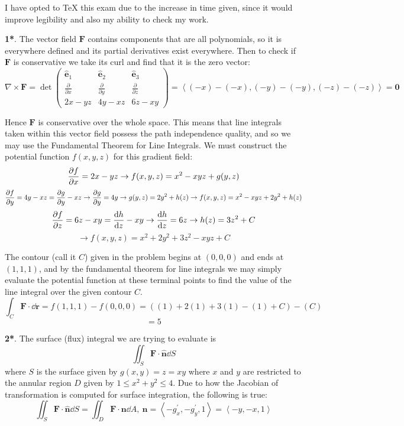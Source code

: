 \documentclass[11pt]{article}
\newcommand{\br}[1]{\left(#1\right)}
\begin{document}
\thispagestyle{firststyle}
I have opted to TeX this exam due to the increase in time given, since it would improve legibility and also my ability to check my work.

\textbf{1*}. The vector field $\mathbf{F}$ contains components that are all polynomials, so it is everywhere defined and its partial derivatives exist everywhere. Then to check if $\mathbf{F}$ is conservative we take its curl and find that it is the zero vector:
$$\nabla \times \mathbf{F} = \det \begin{pmatrix}
    \hat{\mathbf{e}}_1 & \hat{\mathbf{e}}_2 & \hat{\mathbf{e}}_3 \\
    \frac{\partial}{\partial x} & \frac{\partial}{\partial y} & \frac{\partial}{\partial z} \\
    2x-yz & 4y-xz & 6z-xy
\end{pmatrix} = \left\langle (-x)-(-x), (-y)-(-y) ,(-z)-(-z) \right \rangle = \mathbf{0}$$

Hence $\mathbf{F}$ is conservative over the whole space. This means that line integrals taken within this vector field possess the path independence quality, and so we may use the Fundamental Theorem for Line Integrals. We must construct the potential function $f(x,y,z)$ for this gradient field:
$$\pdv{f}{x} = 2x-yz \to f(x,y,z) = x^2-xyz + g(y,z)$$
$$\pdv{f}{y} = 4y-xz = \pdv{g}{y}-xz \to \pdv{g}{y} = 4y \to g(y,z) = 2y^2 + h(z) \to f(x,y,z) = x^2-xyz + 2y^2 + h(z)$$
$$\pdv{f}{z} = 6z-xy = \dv{h}{z} - xy \to \dv{h}{z} = 6z \to h(z) = 3z^2 + C$$
$$\to f(x,y,z) = x^2 + 2y^2 + 3z^2 -xyz + C$$

The contour (call it $C$) given in the problem begins at $(0,0,0)$ and ends at $(1,1,1)$, and by the fundamental theorem for line integrals we may simply evaluate the potential function at these terminal points to find the value of the line integral over the given contour $C$.
$$\int_C \mathbf{F}\cdot \dd{\mathbf{r}} = f(1,1,1) - f(0,0,0) = \br{(1) + 2(1) + 3(1) -(1) + C} - \br{C}$$
$$\boxed{= 5}$$

\noindent\makebox[\linewidth]{\rule{19.1cm}{0.4pt}}

\textbf{2*}. The surface (flux) integral we are trying to evaluate is $$\iint_S \mathbf{F} \cdot \hat{\mathbf{n}} \dd{S}$$ where $S$ is the surface given by $g(x,y) = z = xy$ where $x$ and $y$ are restricted to the annular region $D$ given by $1 \leq x^2+y^2 \leq 4$. Due to how the Jacobian of transformation is computed for surface integration, the following is true:
$$\iint_S \mathbf{F} \cdot \hat{\mathbf{n}} \dd{S} = \iint_D \mathbf{F} \cdot \mathbf{n} \dd{A}, ~ \mathbf{n} = \left\langle -g^{\prime}_x, -g^{\prime}_y ,1 \right \rangle = \left\langle -y, -x ,1 \right\rangle$$
\end{document}
